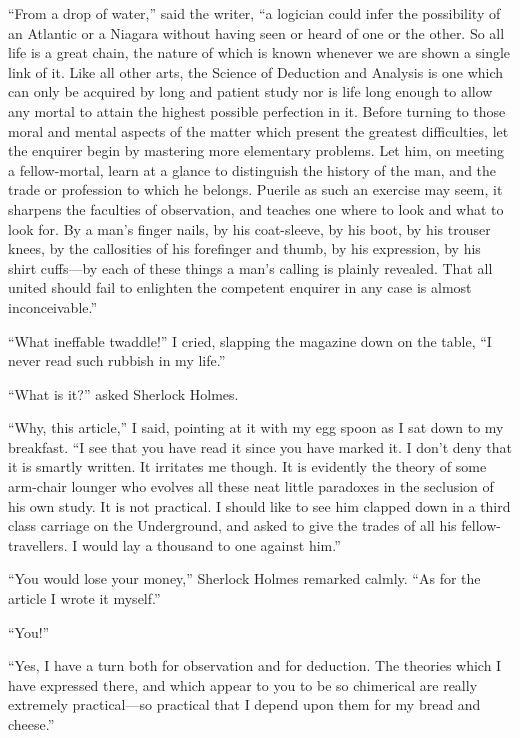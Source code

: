\documentclass[12pt,english,oneside]{book}
\newcommand{\mdsh}[1]{\mbox{#1}\linebreak[1]}
\begin{document}
{}``From a drop of water,'' said the writer, {}``a logician could
infer the possibility of an Atlantic or a Niagara without having seen
or heard of one or the other. So all life is a great chain, the nature
of which is known whenever we are shown a single link of it. Like
all other arts, the Science of Deduction and Analysis is one which
can only be acquired by long and patient study nor is life long enough
to allow any mortal to attain the highest possible perfection in it.
Before turning to those moral and mental aspects of the matter which
present the greatest difficulties, let the enquirer begin by mastering
more elementary problems. Let him, on meeting a fellow-mortal, learn
at a glance to distinguish the history of the man, and the trade or
profession to which he belongs. Puerile as such an exercise may seem,
it sharpens the faculties of observation, and teaches one where to
look and what to look for. By a man's finger nails, by his coat-sleeve,
by his boot, by his trouser knees, by the callosities of his forefinger
and thumb, by his expression, by his shirt cuffs\mdsh{---}by each
of these things a man's calling is plainly revealed. That all united
should fail to enlighten the competent enquirer in any case is almost
inconceivable.''

{}``What ineffable twaddle!'' I cried, slapping the magazine down
on the table, {}``I never read such rubbish in my life.''

{}``What is it?'' asked Sherlock Holmes.

{}``Why, this article,'' I said, pointing at it with my egg spoon
as I sat down to my breakfast. {}``I see that you have read it since
you have marked it. I don't deny that it is smartly written. It irritates
me though. It is evidently the theory of some arm-chair lounger who
evolves all these neat little paradoxes in the seclusion of his own
study. It is not practical. I should like to see him clapped down
in a third class carriage on the Underground, and asked to give the
trades of all his fellow-travellers. I would lay a thousand to one
against him.''

{}``You would lose your money,'' Sherlock Holmes remarked calmly.
{}``As for the article I wrote it myself.''

{}``You!''

{}``Yes, I have a turn both for observation and for deduction. The
theories which I have expressed there, and which appear to you to
be so chimerical are really extremely practical\mdsh{---}so practical
that I depend upon them for my bread and cheese.''
\end{document}
